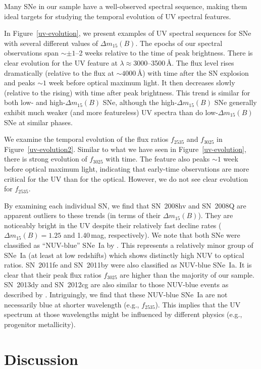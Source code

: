 \documentclass[useAMS,usenatbib]{mn2e}
\newcommand{\deltam}{\ensuremath{\Delta m_{15}}}
\begin{document}
Many SNe in our sample have a well-observed spectral sequence, making them ideal targets for studying the temporal evolution of UV spectral features. 

In Figure~\ref{uv-evolution}, we present examples of UV spectral sequences for SNe with several different values of $\deltam(B)$. The epochs of our spectral observations span $\sim\pm1$--2 weeks relative to the time of peak brightness. There is clear evolution for the UV feature at $\lambda\approx3000$--3500\,\AA. The flux level rises dramatically (relative to the flux at $\sim4000$\,\AA) with time after the SN explosion and peaks $\sim1$ week before optical maximum light. It then decreases slowly (relative to the rising) with time after peak brightness. This trend is similar for both low- and high-$\deltam(B)$ SNe, although the high-$\deltam(B)$ SNe generally exhibit much weaker (and more featureless) UV spectra than do low-$\deltam(B)$ SNe at similar phases.

We examine the temporal evolution of the flux ratios $f_{2535}$ and $f_{3025}$ in Figure~\ref{uv-evolution2}. Similar to what we have seen in Figure~\ref{uv-evolution}, there is strong evolution of $f_{3025}$ with time. The feature also peaks $\sim1$ week before optical maximum light, indicating that early-time observations are more critical for the UV than for the optical. However, we do not see clear evolution for $f_{2535}$. 

By examining each individual SN, we find that SN~2008hv and SN~2008Q are apparent outliers to these trends (in terms of their $\deltam(B)$). They are noticeably bright in the UV despite their relatively fast decline rates ($\deltam(B)=1.25$ and 1.40\,mag, respectively). We note that both SNe were classified as ``NUV-blue'' SNe~Ia by \citet{2013ApJ...779...23M}. This represents a relatively minor group of SNe~Ia (at least at low redshifts) which shows distinctly high NUV to optical ratios. SN~2011fe and SN~2011by were also classified as NUV-blue SNe~Ia. It is clear that their peak flux ratios $f_{3025}$ are higher than the majority of our sample. SN~2013dy and SN~2012cg are also similar to those NUV-blue events as described by \citet{2013ApJ...779...23M}. Intriguingly, we find that these NUV-blue SNe~Ia are not necessarily blue at shorter wavelength (e.g., $f_{2535}$). This implies that the UV spectrum at those wavelengths might be influenced by different physics (e.g., progenitor metallicity).

\section{Discussion}
\label{sec:discussion}
\end{document}
